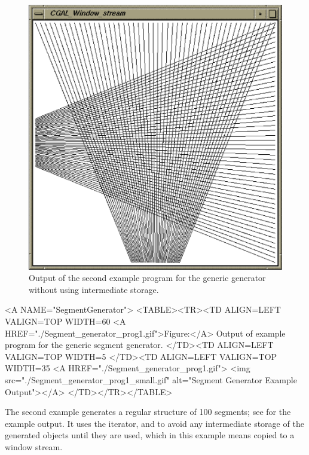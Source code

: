 \begin{ccTexOnly}
\begin{figure}
    \begin{minipage}[t]{0.45\textwidth}%
      \includegraphics[width=\textwidth]{Generator/Segment_generator_prog2.ps}
      \caption{Output of the second example program for the generic
        generator without using intermediate storage.}
      \label{figureSegmentGeneratorFan}
    \end{minipage}%
  \end{figure}
\end{ccTexOnly}


\begin{ccHtmlOnly}
  <A NAME="SegmentGenerator">
  <TABLE><TR><TD ALIGN=LEFT VALIGN=TOP WIDTH=60%
    <A HREF="./Segment_generator_prog1.gif">Figure:</A>
    Output of example program for the generic segment generator.
  </TD><TD ALIGN=LEFT VALIGN=TOP WIDTH=5%
  </TD><TD ALIGN=LEFT VALIGN=TOP WIDTH=35%
    <A HREF="./Segment_generator_prog1.gif">
        <img src="./Segment_generator_prog1_small.gif" 
             alt="Segment Generator Example Output"></A>
  </TD></TR></TABLE>
\end{ccHtmlOnly}

The second example generates a regular structure of 100 segments; see 
 for the example
output. It uses the %
 iterator,
%
and  %
to avoid any intermediate storage of the generated objects until they are
used, which in this example means copied to a window stream.

